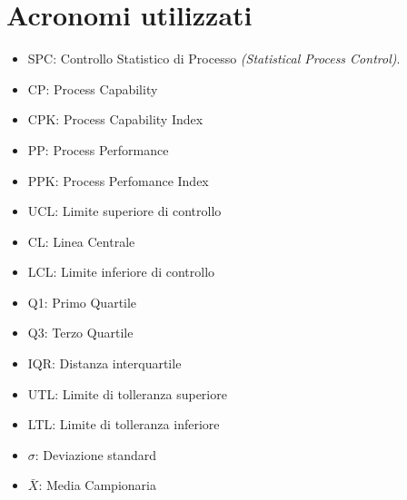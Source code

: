 \chapter*{Acronomi utilizzati}

\begin{itemize}
    \item SPC: Controllo Statistico di Processo \textit{(Statistical Process Control)}.
    \item CP: Process Capability
    \item CPK: Process Capability Index
    \item PP: Process Performance
    \item PPK: Process Perfomance Index
    \item UCL: Limite superiore di controllo
    \item CL: Linea Centrale
    \item LCL: Limite inferiore di controllo 
    \item Q1: Primo Quartile
    \item Q3: Terzo Quartile
    \item IQR: Distanza interquartile
    \item UTL: Limite di tolleranza superiore
    \item LTL: Limite di tolleranza inferiore
    \item  $\mathit{\sigma}$: Deviazione standard
    \item $\mathit{\bar{X}}$: Media Campionaria
\end{itemize}

